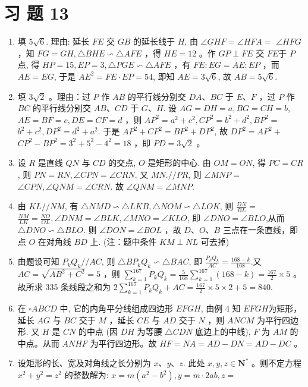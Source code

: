 \documentclass[10pt]{article}
\begin{document}
\section*{习 题 13}
\begin{enumerate}
  \item 填 $5 \sqrt{6}$. 理由: 延长 $F E$ 交 $G B$ 的延长线于 $H$, 由 $\angle G H F=\angle H F A=$ $\angle H F G$ ，知 $F G=G H, \triangle B H E \backsim \triangle A F E$ ，得 $H E=12$ 。作 $G P \perp F E$ 交 $F E$于 $P$ 点, 得 $H P=15, E P=3, \triangle P G E \backsim \triangle A F E$ ，有 $F E: E G=A E: E P$ ，而 $A E=E G$, 于是 $A E^{2}=F E \cdot E P=54$, 即知 $A E=3 \sqrt{6}$, 故 $A B=5 \sqrt{6}$.
  \item 填 $3 \sqrt{2}$ 。理由：过 $P$ 作 $A B$ 的平行线分别交 $D A 、 B C$ 于 $E 、 F$ ，过 $P$ 作 $B C$ 的平行线分别交 $A B 、 C D$ 于 $G 、 H$. 设 $A G=D H=a, B G=C H=b$, $A E=B F=c, D E=C F=d$ ，则 $A P^{2}=a^{2}+c^{2}, C P^{2}=b^{2}+d^{2}, B P^{2}=$ $b^{2}+c^{2}, D P^{2}=d^{2}+a^{2}$. 于是 $A P^{2}+C P^{2}=B P^{2}+D P^{2}$, 故 $D P^{2}=A P^{2}+$ $C P^{2}-B P^{2}=3^{2}+5^{2}-4^{2}=18$ ，即 $P D=3 \sqrt{2}$ 。
  \item 设 $R$ 是直线 $Q N$ 与 $C D$ 的交点, $O$ 是矩形的中心. 由 $O M=O N$, 得 $P C=C R$, 则 $P N=R N, \angle C P N=\angle C R N$. 又 $M N . / / P R$, 则 $\angle M N P=$ $\angle C P N, \angle Q N M=\angle C R N$. 故 $\angle Q N M=\angle M N P$.
  \item 由 $K L / / N M$, 有 $\triangle N M D \backsim \triangle L K B, \triangle N O M \backsim \triangle L O K$, 则 $\frac{D N}{B L}=$ $\frac{N M}{L K}=\frac{N O}{O L}, \angle D N M=\angle B L K, \angle M N O=\angle K L O$, 即 $\angle D N O=\angle B L O$,从而 $\triangle D N O \backsim \triangle B L O$. 则 $\angle D O N=\angle B O L$ ，故 $D 、 O 、 B$ 三点在一条直线，即点 $O$ 在对角线 $B D$ 上. (注：题中条件 $K M \perp N L$ 可去掉)
  \item 由题设可知 $P_{k} Q_{k} / / A C$, 则 $\triangle B P_{k} Q_{k} \backsim \triangle B A C$, 即 $\frac{P_{k} Q_{k}}{A C}=\frac{168-k}{168}$.又 $A C=\sqrt{A B^{2}+C^{2}}=5$ ，则 $\sum_{k=1}^{167} P_{k} Q_{k}=\frac{5}{168} \sum_{k=1}^{167}(168-k)=\frac{167}{2} \times 5$ 。故所求 335 条线段之和为 $2 \sum_{k=1}^{167} P_{k} Q_{k}+A C=\frac{167}{2} \times 5 \times 2+5=840$.
  \item 在 $\square A B C D$ 中, 它的内角平分线组成四边形 $E F G H$, 由例 4 知 $E F G H$为矩形，延长 $A G$ 与 $B C$ 交于 $M$ ，延长 $C E$ 与 $A D$ 交于 $N$ ，则 $A N C M$ 为平行四边形. 又 $H$ 是 $C N$ 的中点 (因 $D H$ 为等腰 $\triangle C D N$ 底边上的中线), $F$ 为 $A M$ 的中点。从而 $A N H F$ 为平行四边形。故 $H F=N A=A D-D N=A D-D C$ 。
  \item 设矩形的长、宽及对角线之长分别为 $x 、 y 、 z$. 此处 $x, y, z \in \mathbf{N}^{*}$ 。则不定方程 $x^{2}+y^{2}=z^{2}$ 的整数解为: $x=m\left(a^{2}-b^{2}\right), y=m \cdot 2 a b, z=$
\end{enumerate}
\end{document}
